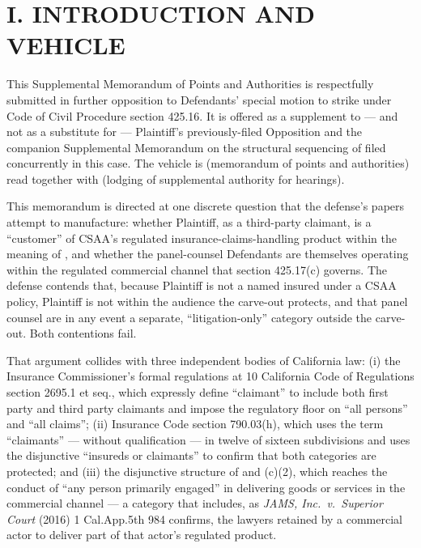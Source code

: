 \newcommand{\docshorttitle}{SUPPL.\ MEMO P\&A --- ``CUSTOMER'' DOCTRINE \S 425.17(c) (CGC-25-631801)}
\newcommand{\doctitleblock}{PLAINTIFF'S SUPPLEMENTAL MEMORANDUM OF POINTS AND AUTHORITIES IN FURTHER OPPOSITION TO DEFENDANTS' SPECIAL MOTION TO STRIKE --- ``CUSTOMER'' DOCTRINE UNDER \S 425.17(c) AND THE THIRD-PARTY CLAIMANT (INSURER \& PANEL COUNSEL)}
\newcommand{\docsubblock}{(Cal.\ Rules of Court, rules 3.1113, 3.1306(c); supplemental to Plaintiff's previously-filed Opposition; cross-noticed for hearings of May 12, 2026 and May 22, 2026, Dept.\ 301)}




\section*{I. INTRODUCTION AND VEHICLE}

This Supplemental Memorandum of Points and Authorities is respectfully submitted in further opposition to Defendants' special motion to strike under Code of Civil Procedure section 425.16. It is offered as a supplement to --- and not as a substitute for --- Plaintiff's previously-filed Opposition and the companion Supplemental Memorandum on the structural sequencing of  filed concurrently in this case. The vehicle is  (memorandum of points and authorities) read together with  (lodging of supplemental authority for hearings).

This memorandum is directed at one discrete question that the defense's papers attempt to manufacture: whether Plaintiff, as a third-party claimant, is a ``customer'' of CSAA's regulated insurance-claims-handling product within the meaning of , and whether the panel-counsel Defendants are themselves operating within the regulated commercial channel that section 425.17(c) governs. The defense contends that, because Plaintiff is not a named insured under a CSAA policy, Plaintiff is not within the audience the carve-out protects, and that panel counsel are in any event a separate, ``litigation-only'' category outside the carve-out. Both contentions fail.

That argument collides with three independent bodies of California law: (i) the Insurance Commissioner's formal regulations at 10 California Code of Regulations section 2695.1 et seq., which expressly define ``claimant'' to include both first party and third party claimants and impose the regulatory floor on ``all persons'' and ``all claims''; (ii) Insurance Code section 790.03(h), which uses the term ``claimants'' --- without qualification --- in twelve of sixteen subdivisions and uses the disjunctive ``insureds or claimants'' to confirm that both categories are protected; and (iii) the disjunctive structure of  and (c)(2), which reaches the conduct of ``any person primarily engaged'' in delivering goods or services in the commercial channel --- a category that includes, as \textit{JAMS, Inc.\ v.\ Superior Court} (2016) 1 Cal.App.5th 984 confirms, the lawyers retained by a commercial actor to deliver part of that actor's regulated product.

